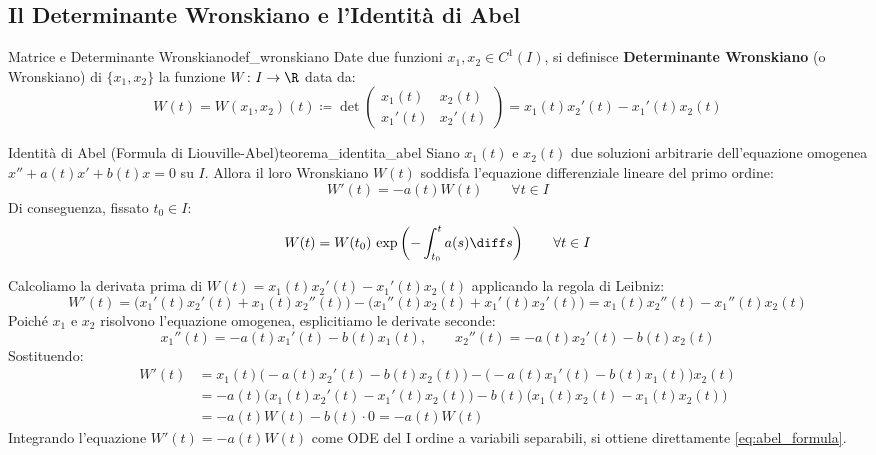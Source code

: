 \subsection{Il Determinante Wronskiano e l'Identità di Abel}

\begin{definizione}{Matrice e Determinante Wronskiano}{def_wronskiano}
Date due funzioni $x_1, x_2 \in C^1(I)$, si definisce \textbf{Determinante Wronskiano} (o Wronskiano) di $\{x_1, x_2\}$ la funzione $W \colon I \to \R$ data da:
\begin{equation}
    \label{eq:wronskiano_def}
    W(t) = W(x_1, x_2)(t) \coloneqq \det \begin{pmatrix} x_1(t) & x_2(t) \\ x_1'(t) & x_2'(t) \end{pmatrix} = x_1(t) x_2'(t) - x_1'(t) x_2(t)
\end{equation}
\end{definizione}

\begin{teorema}{Identità di Abel (Formula di Liouville-Abel)}{teorema_identita_abel}
Siano $x_1(t)$ e $x_2(t)$ due soluzioni arbitrarie dell'equazione omogenea $x'' + a(t)x' + b(t)x = 0$ su $I$.
Allora il loro Wronskiano $W(t)$ soddisfa l'equazione differenziale lineare del primo ordine:
\begin{equation}
    \label{eq:ode_wronskiano}
    W'(t) = -a(t) W(t) \qquad \forall t \in I
\end{equation}
Di conseguenza, fissato $t_0 \in I$:
\begin{equation}
    \label{eq:abel_formula}
    W(t) = W(t_0) \, \exp\left( -\int_{t_0}^t a(s) \diff s \right) \qquad \forall t \in I
\end{equation}
\end{teorema}

\begin{dimostrazione}
Calcoliamo la derivata prima di $W(t) = x_1(t) x_2'(t) - x_1'(t) x_2(t)$ applicando la regola di Leibniz:
\[
    W'(t) = \big( x_1'(t) x_2'(t) + x_1(t) x_2''(t) \big) - \big( x_1''(t) x_2(t) + x_1'(t) x_2'(t) \big) = x_1(t) x_2''(t) - x_1''(t) x_2(t)
\]
Poiché $x_1$ e $x_2$ risolvono l'equazione omogenea, esplicitiamo le derivate seconde:
\[
    x_1''(t) = -a(t) x_1'(t) - b(t) x_1(t), \qquad x_2''(t) = -a(t) x_2'(t) - b(t) x_2(t)
\]
Sostituendo:
\begin{align*}
    W'(t) &= x_1(t) \big( -a(t) x_2'(t) - b(t) x_2(t) \big) - \big( -a(t) x_1'(t) - b(t) x_1(t) \big) x_2(t) \\
    &= -a(t) \big( x_1(t) x_2'(t) - x_1'(t) x_2(t) \big) - b(t) \big( x_1(t) x_2(t) - x_1(t) x_2(t) \big) \\
    &= -a(t) W(t) - b(t) \cdot 0 = -a(t) W(t)
\end{align*}
Integrando l'equazione $W'(t) = -a(t)W(t)$ come ODE del I ordine a variabili separabili, si ottiene direttamente \eqref{eq:abel_formula}.
\end{dimostrazione}

